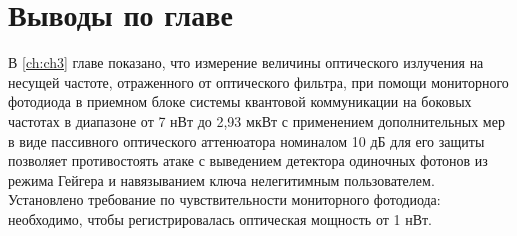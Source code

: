 \section{Выводы по главе} \label{ch:ch3/sec8}


В \ref{ch:ch3} главе показано, что измерение величины оптического излучения на несущей частоте, отраженного от оптического фильтра, при помощи мониторного фотодиода в приемном блоке системы квантовой коммуникации на боковых частотах в диапазоне от 7 нВт до 2,93 мкВт с применением дополнительных мер в виде пассивного оптического аттенюатора номиналом 10 дБ для его защиты позволяет противостоять атаке с выведением детектора одиночных фотонов из режима Гейгера и навязыванием ключа нелегитимным пользователем. Установлено требование по чувствительности мониторного фотодиода: необходимо, чтобы регистрировалась оптическая мощность от 1 нВт.
  